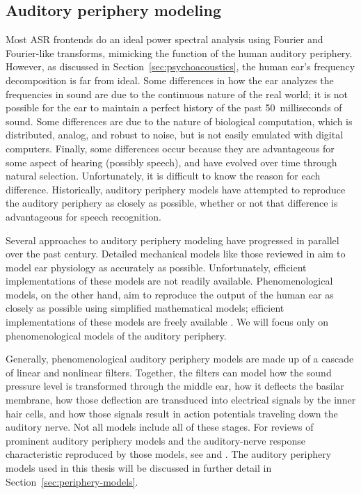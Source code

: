 \subsection{Auditory periphery modeling}

Most ASR frontends do an ideal
power spectral analysis
using Fourier and Fourier-like transforms,
mimicking the function
of the human auditory periphery.
However, as discussed in Section~\ref{sec:psychoacoustics},
the human ear's frequency decomposition
is far from ideal.
Some differences in how the ear
analyzes the frequencies in sound
are due to the continuous nature
of the real world;
it is not possible for the ear
to maintain a perfect history
of the past 50~milliseconds of sound.
Some differences are due to
the nature of biological computation,
which is distributed, analog, and robust to noise,
but is not easily emulated with digital computers.
Finally, some differences
occur because they are advantageous
for some aspect of hearing
(possibly speech),
and have evolved over time through natural selection.
Unfortunately, it is difficult to know
the reason for each difference.
Historically, auditory periphery models
have attempted to reproduce
the auditory periphery as closely as possible,
whether or not that difference is advantageous
for speech recognition.

Several approaches to auditory periphery modeling
have progressed in parallel over the past century.
Detailed mechanical models
like those reviewed in \citet{ni2014}
aim to model ear physiology
as accurately as possible.
Unfortunately, efficient implementations
of these models are not readily available.
Phenomenological models, on the other hand,
aim to reproduce the output
of the human ear
as closely as possible
using simplified mathematical models;
efficient implementations of these
models are freely available
\citep{fontaine2011}.
We will focus only on phenomenological
models of the auditory periphery.

Generally, phenomenological auditory periphery models
are made up of a cascade of linear and nonlinear filters.
Together, the filters can model
how the sound pressure level
is transformed through the middle ear,
how it deflects the basilar membrane,
how those deflection are transduced
into electrical signals
by the inner hair cells,
and how those signals result in
action potentials traveling down
the auditory nerve.
Not all models include all of these stages.
For reviews of prominent
auditory periphery models and
the auditory-nerve response characteristic
reproduced by those models,
see \citet{lopez2005}
and \citet{lyon2010}.
The auditory periphery models used
in this thesis will be discussed
in further detail in
Section~\ref{sec:periphery-models}.


